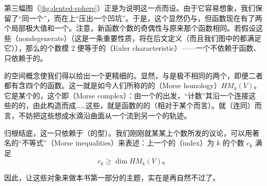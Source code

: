 第三幅图（\cref{fig:dented-sphere}）正是为说明这一点而设。由于它容易想象，我们保留了“同一个”\trHeightFunction，而在\trSphere{}上“压出一个凹坑”。于是，这个\trSubmanifold{}显然仍与\trSphere\trDiffeomorphic，但函数现在有了两个局部极大值和一个\trSaddlePoint。注意，新函数\trCriticalPoint{}个数的奇偶性与原来那个函数相同。若假设这些\trCriticalPoint\trNondegenerate（nondegenerate）（这是一条重要性质，将在后文定义（而且我们图中的\trCriticalPoint{}都满足它）），那么\trCriticalPoint{}的个数模 2 便等于\trManifold{}的\trEulerCharacteristic（Euler characteristic）——一个不依赖于函数、只依赖于\trManifold{}的\trInvariant。

\trWitten{}的\trTrajectory{}空间概念使我们得以给出一个更精细的\trInvariant。显然，\trTorus{}与\trSphere{}是极不相同的两个\trManifold，即便二者都有含四个\trNondegenerate\trCriticalPoint{}的函数。这一\trInvariant{}就是如今人们所称的\trManifold{}的\textbf{\trMorseHomology}（Morse homology）$HM_k(V)$。它是某个\trChainComplex{}的\trHomology，这个\trComplex{}即\textbf{\trMorseComplex}（Morse complex）：由一个\trMorseFunction{}的\trCriticalPoint{}出发，“计数”其沿一个连接这些\trCriticalPoint{}的\trVectorField{}的\trTrajectory，由此构造而成……这些\trTrajectory，就是函数的\trGradient{}的\trTrajectory（相对于某个\trMetric{}而言）。就\trHeightFunction（连同\trEuclidean\trMetric）而言，不妨把这些\trTrajectory{}想成水滴沿曲面从一个\trCriticalPoint{}流到另一个\trCriticalPoint{}的轨迹。

归根结底，这一\trHomology{}只依赖于\trManifold（的\trDiffeomorphic{}型）。我们刚刚就某某\trManifold{}上\trCriticalPoint{}个数所发的议论，可以用著名的“\trMorse{}不等式”（Morse inequalities）来表述：\trManifold{}上一个\trMorseFunction{}的\textbf{\trIndex}（index）为 $k$ 的\trCriticalPoint{}个数 $c_k$ 满足
\[
c_k\geq \dim HM_k(V)\text{。}
\]

因此，让这些对象来做本书第一部分的主题，实在是再自然不过了。

\renewcommand{\thefigure}{\thechapter.\arabic{figure}}
